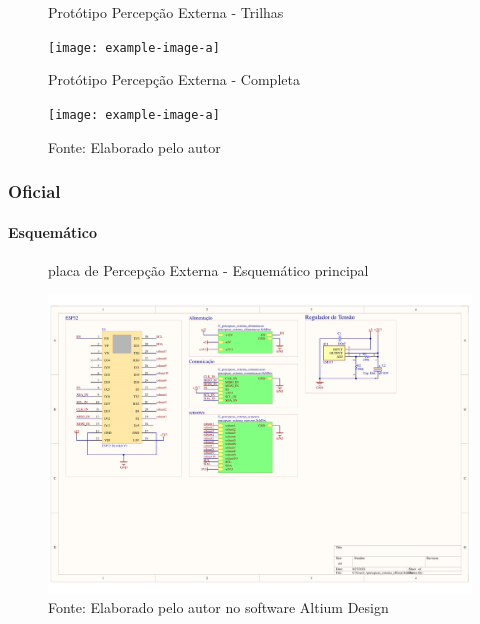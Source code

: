 \documentclass[../delivery_hospital_report.tex]{subfiles}
\begin{document}
\begin{figure}[!ht]
    \centering
    \begin{minipage}{0.5\textwidth}
        \centering
        \caption{Protótipo Percepção Externa - Trilhas}
        \texttt{[image: example-image-a]} 
        \label{fig:figura1minipg}
    \end{minipage}\hfill
    \begin{minipage}{0.5\textwidth}
        \centering
        \caption{Protótipo Percepção Externa - Completa}
        \texttt{[image: example-image-a]} 
        \label{fig:figura1minipg}
    \end{minipage}\hfill
    
    \caption*{Fonte: Elaborado pelo autor }
    \label{fig:figurasminipg}
\end{figure}

\subsubsection{Oficial}

\paragraph{Esquemático}

\begin{figure}[h]
\centering
    \caption{placa de Percepção Externa - Esquemático principal }
    \centering %
    \includegraphics[width=17cm]{modulos/percepcao_externa_official-1.png}
    \caption*{Fonte: Elaborado pelo autor no software Altium Design\cite{altium21} }
    \label{Protótipo placa de ## - Esquemático principal}
\end{figure}
\end{document}
